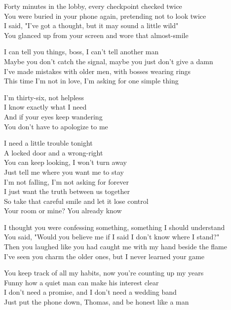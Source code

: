\begin{lyrics}
Forty minutes in the lobby, every checkpoint checked twice\\
You were buried in your phone again, pretending not to look twice\\
I said, "I've got a thought, but it may sound a little wild"\\
You glanced up from your screen and wore that almost-smile

I can tell you things, boss, I can't tell another man\\
Maybe you don't catch the signal, maybe you just don't give a damn\\
I've made mistakes with older men, with bosses wearing rings\\
This time I'm not in love, I'm asking for one simple thing

I'm thirty-six, not helpless\\
I know exactly what I need\\
And if your eyes keep wandering\\
You don't have to apologize to me

I need a little trouble tonight\\
A locked door and a wrong-right\\
You can keep looking, I won't turn away\\
Just tell me where you want me to stay\\
I'm not falling, I'm not asking for forever\\
I just want the truth between us together\\
So take that careful smile and let it lose control\\
Your room or mine? You already know

I thought you were confessing something, something I should understand\\
You said, "Would you believe me if I said I don't know where I stand?"\\
Then you laughed like you had caught me with my hand beside the flame\\
I've seen you charm the older ones, but I never learned your game

You keep track of all my habits, now you're counting up my years\\
Funny how a quiet man can make his interest clear\\
I don't need a promise, and I don't need a wedding band\\
Just put the phone down, Thomas, and be honest like a man


\end{lyrics}
